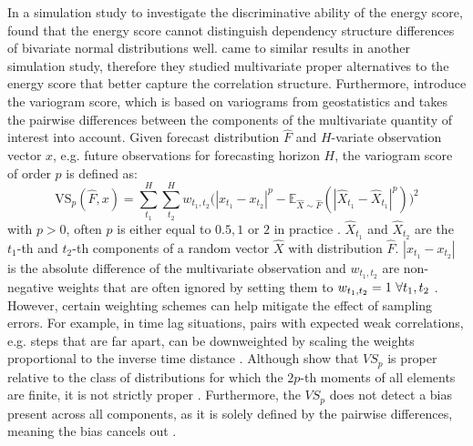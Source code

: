\documentclass[a4paper,oneside,bibliography=totoc]{scrbook}
\begin{document}
\noindent
In a simulation study to investigate the discriminative ability of the energy score, \citet{pinson_discrimination_2013} found that the energy score cannot distinguish dependency structure differences of bivariate normal distributions well. \citet{scheuerer_variogram-based_2015} came to similar results in another simulation study, therefore they studied multivariate proper alternatives to the energy score that better capture the correlation structure. 
Furthermore, \citet{scheuerer_variogram-based_2015} introduce the variogram score, which is based on variograms from geostatistics \cite{matheron_principles_1963, cressie_fitting_1985} and takes the pairwise differences between the components of the multivariate quantity of interest into account. 
Given forecast distribution $\hat{F}$ and $H$-variate observation vector $x$, e.g. future observations for forecasting horizon $H$, the variogram score of order $p$ is defined as:
 \begin{equation}
    \text{VS}_p(\hat{F}, x) = \sum_{t_1}^H \sum_{t_2}^H w_{t_1,t_2}\Big(|x_{t_1} - x_{t_2}|^p- \mathbb{E}_{\hat{X} \sim \hat{F}}(|\hat{X}_{t_1}-\hat{X}_{t_1}|^p)\Big)^2
    \label{eq:vs}
\end{equation}
with $p>0$, often $p$ is either equal to $0.5, 1\text{ or }2$ in practice \cite{alexander_evaluating_2024}. $\hat{X}_{t_1}$ and $\hat{X}_{t_2}$ are the ${t_1}$-th and ${t_2}$-th components of a random vector $\hat{X}$ with distribution $\hat{F}$.
$|x_{t_1} - x_{t_2}|$ is the absolute difference of the multivariate observation and $w_{{t_1},{t_2}}$ are non-negative weights that are often ignored by setting them to $w_{{t_1},{t_2}}=1 \thinspace \thinspace \forall {t_1},{t_2}$ \cite{ziel_multivariate_2019, alexander_evaluating_2024}. 
However, certain weighting schemes can help mitigate the effect of sampling errors. For example, in time lag situations, pairs with expected weak correlations, e.g. steps that are far apart, can be downweighted by scaling the weights proportional to the inverse time distance \cite{scheuerer_variogram-based_2015}.
Although \citet{scheuerer_variogram-based_2015} show that $VS_p$ is proper relative to  the class of distributions for which the $2p$-th moments of all elements are finite, it is not strictly proper \cite{alexander_evaluating_2024}. 
Furthermore, the $VS_p$ does not detect a bias present across all components, as it is solely defined by the pairwise differences, meaning the bias cancels out \cite{alexander_evaluating_2024}.
\newline
\end{document}
